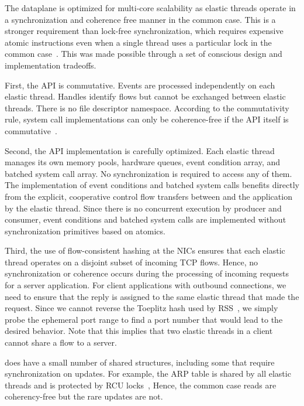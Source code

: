 The \ix dataplane is optimized for multi-core scalability as elastic
threads operate in a synchronization and coherence free manner in the
common case. This is a stronger requirement than lock-free
synchronization, which requires expensive atomic instructions even
when a single thread uses a particular lock in the common
case~\cite{DBLP:conf/sosp/DavidGT13}.  This was made possible 
through a set of conscious design and implementation tradeoffs. 



First, the \ix API is commutative. Events are processed independently
on each elastic thread. Handles identify flows but cannot be exchanged
between elastic threads. There is no file descriptor namespace.
According to the commutativity rule, system call implementations can
only be coherence-free if the API itself is
commutative~\cite{DBLP:conf/sosp/ClementsKZMK13}.

Second, the API implementation is carefully optimized.  Each elastic
thread manages its own memory pools, hardware queues, event condition
array, and batched system call array. No synchronization is required
to access any of them. The implementation of event conditions and
batched system calls benefits directly from the explicit, cooperative
control flow transfers between \ix and the application by the elastic
thread.  Since there is no concurrent execution by producer and
consumer, event conditions and batched system calls are implemented
without synchronization primitives based on
atomics.

Third, the use of flow-consistent hashing at the NICs ensures that
each elastic thread operates on a disjoint subset of incoming TCP
flows. Hence, no synchronization or coherence occurs during the
processing of incoming requests for a server application. For client
applications with outbound connections, we need to ensure that the
reply is assigned to the same elastic thread that made the
request. Since we cannot reverse the Toeplitz hash used by RSS~\cite{url:rss}, we
simply probe the ephemeral port range to find a port number that
would lead to the desired behavior. Note that this implies that two
elastic threads in a client cannot share a flow to a server.


\ix does have a small number of shared structures, including some that
require synchronization on updates.  For example, the ARP table is
shared by all elastic threads and is protected by RCU
locks~\cite{mckenney1998read}, Hence, the common case reads are
coherency-free but the rare updates are not.
%


